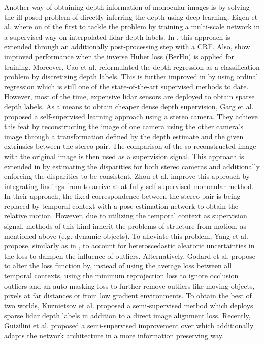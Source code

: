 Another way of obtaining depth information of monocular images is by solving the ill-posed problem of directly inferring the depth using deep learning. Eigen et al. \cite{eigen2014depth} where on of the first to tackle the problem by training a multi-scale network in a supervised way on interpolated lidar depth labels. In \cite{liu2015deep,li2015depth}, this approach is extended through an additionally post-processing step with a CRF. Also, \cite{laina2016deeper} show improved performance when the inverse Huber loss (BerHu) is applied for training. Moreover, Cao et al. \cite{cao2017estimating} reformulated the depth regression as a classification problem by discretizing depth labels. This is further improved in \cite{fu2018deep} by using ordinal regression which is still one of the state-of-the-art supervised methods to date. However, most of the time, expensive lidar sensors are deployed to obtain sparse depth labels. As a means to obtain cheaper dense depth supervision, Garg et al. \cite{garg2016unsupervised} proposed a self-supervised learning approach using a stereo camera. They achieve this feat by reconstructing the image of one camera using the other camera's image through a transformation defined by the depth estimate and the given extrinsics between the stereo pair. The comparison of the so reconstructed image with the original image is then used as a supervision signal. This approach is extended in \cite{godard2017unsupervised} by estimating the disparities for both stereo cameras and additionally enforcing the disparities to be consistent. Zhou et al. \cite{zhou2017unsupervised} improve this approach by integrating findings from \cite{ummenhofer2017demon} to arrive at at fully self-supervised monocular method. In their approach, the fixed correspondence between the stereo pair is being replaced by temporal context with a pose estimation network to obtain the relative motion. However, due to utilizing the temporal context as supervision signal, methods of this kind inherit the problems of structure from motion, as mentioned above (e.g. dynamic objects). To alleviate this problem, Yang et al. \cite{yang2020d3vo} propose, similarly as in \cite{feng2019leveraging}, to account for heteroscedastic aleatoric uncertainties in the loss to dampen the influence of outliers. Alternatively, Godard et al. \cite{godard2019digging} propose to alter the loss function by, instead of using the average loss between all temporal contexts, using the minimum reprojection loss to ignore occlusion outliers and an auto-masking loss to further remove outliers like moving objects, pixels at far distances or from low gradient environments. To obtain the best of two worlds, Kuznietsov et al. \cite{kuznietsov2017semi} proposed a semi-supervised method which deploys sparse lidar depth labels in addition to a direct image alignment loss. Recently, Guizilini et al. \cite{guizilini2020robust} proposed a semi-supervised improvement over \cite{godard2019digging} which additionally adapts the network architecture in a more information preserving way.
%
